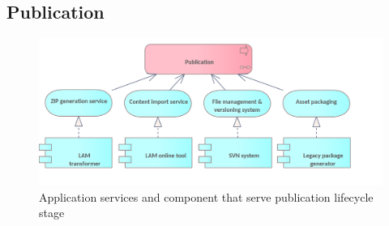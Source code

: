 	\subsection{Publication}
	
	 \begin{figure}[!h]
		\centering
		\includegraphics[width=.8\textwidth]{images/application/lifecycle/Publication.png}
		\caption{Application services and component that serve publication lifecycle stage}
		\label{fig:app-publication}
	\end{figure}